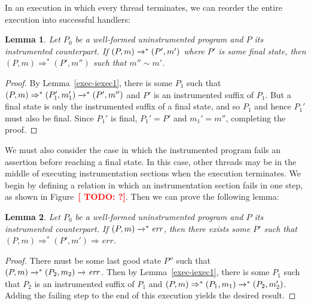 \documentclass[preprint, 10pt]{sigplanconf}
\newcommand{\TODO}[1]{\textbf{\textcolor{red}{[ TODO: #1]}}}
\newcommand{\cfg}[2]{\ensuremath{(#1, #2)}}
\newcommand{\execstar}[4]{\ensuremath{\cfg{#1}{#2} \tto{#3} #4}}
\newcommand{\execs}[3]{\ensuremath{ \xrightarrow{#2}_{#1} #3}}
\newcommand{\execstars}[2]{\ensuremath{ \tto{#1} #2}}
\newcommand{\iexecs}[2]{\ensuremath{ \Rightarrow_{#1} #2}}
\newcommand{\iexecstar}[3]{\ensuremath{(#1, #2) \Rightarrow^{*} #3}}
\newcommand{\tto}[1]{\mathrel{
  \vphantom{\xrightarrow{#1}}
  \smash{\xrightarrow{#1}}
  \vphantom{\to}^{*}}
}
\newtheorem{lemma}{Lemma}
\begin{document}
In an execution in which every thread terminates, we can reorder the entire execution into successful handlers:
\begin{lemma}\label{exec-iexec}Let $P_0$ be a well-formed uninstrumented program and $P$ its instrumented counterpart. If $\execstar{P}{m}{}{(P', m')}$ where $P'$ is some final state, then $\iexecstar{P}{m}{(P', m'')}$ such that $m'' \sim m'$.\end{lemma}
\begin{proof}By Lemma~\ref{exec-iexec1}, there is some $P_1$ such that $\iexecstar{P}{m}{(P_1', m_1')} \execstars{}{(P', m'')}$ and $P'$ is an instrumented suffix of $P_1$. But a final state is only the instrumented suffix of a final state, and so $P_1$ and hence $P_1'$ must also be final. Since $P_1'$ is final, $P_1' = P'$ and $m_1' = m''$, completing the proof.\end{proof}

We must also consider the case in which the instrumented program fails an assertion before reaching a final state. In this case, other threads may be in the middle of executing instrumentation sections when the execution terminates. We begin by defining a relation in which an instrumentation section fails in one step, as shown in Figure~\TODO{?}. Then we can prove the following lemma:
\begin{lemma}\label{exec-fail-iexec}Let $P_0$ be a well-formed uninstrumented program and $P$ its instrumented counterpart. If $\execstar{P}{m}{}{\mathit{err}}$, then there exists some $P'$ such that $\iexecstar{P}{m}{(P', m')} \iexecs{}{\mathit{err}}$.\end{lemma}
\begin{proof}There must be some last good state $P''$ such that $\execstar{P}{m}{}{(P_2, m_2)} \execs{}{}{\mathit{err}}$. Then by Lemma~\ref{exec-iexec1}, there is some $P_1$ such that $P_2$ is an instrumented suffix of $P_1$ and $\iexecstar{P}{m}{(P_1, m_1)} \execstars{}{(P_2, m_2')}$. Adding the failing step to the end of this execution yields the desired result.\end{proof}
\end{document}
